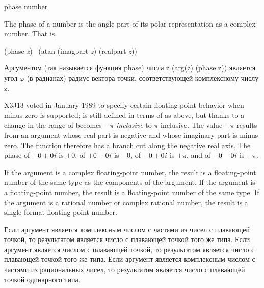 \begin{defun}[Function]
phase number

The phase of a number is the angle part of its polar representation
as a complex number.  That is,
\begin{lisp}
(phase \emph{z}) \EQ\ (atan (imagpart \emph{z}) (realpart \emph{z}))
\end{lisp}

Аргументом (так называется функция phase) числа z (arg(z) \EQ (phase z))
является угол $\varphi$ (в радианах) радиус-вектора точки, соответствующей
комплексному числу z.

\begin{new}
X3J13 voted in January 1989
to specify certain floating-point behavior when minus zero is supported;
 is still defined in terms of  as above,
but thanks to a change in  the range of 
becomes $-\pi$ \emph{inclusive} to $\pi$ inclusive.  The value $-\pi$
results from an argument
whose real part is negative and whose imaginary
part is minus zero.  The  function therefore has a branch cut
along the negative real axis.  The phase of $+0+0\emph{i}$ is $+0$, of $+0-0\emph{i}$ is $-0$,
of $-0+0\emph{i}$ is $+\pi$, and of $-0-0\emph{i}$ is $-\pi$.
\end{new}

If the argument is a complex floating-point number, the result
is a floating-point number of the same type as the components of
the argument.
If the argument is a floating-point number, the result is a
floating-point number of the same type.
If the argument is a rational number or complex rational number, the result
is a single-format floating-point number.

Если аргумент является комплексным числом с частями из чисел с плавающей точкой,
то результатом является число с плавающей точкой того же типа.
Если аргумент является числом с плавающей точкой,
то результатом является число с плавающей точкой того же типа.
Если аргумент является комплексным числом с частями из рациональных чисел,
то результатом является число с плавающей точкой одинарного типа.
\end{defun}

